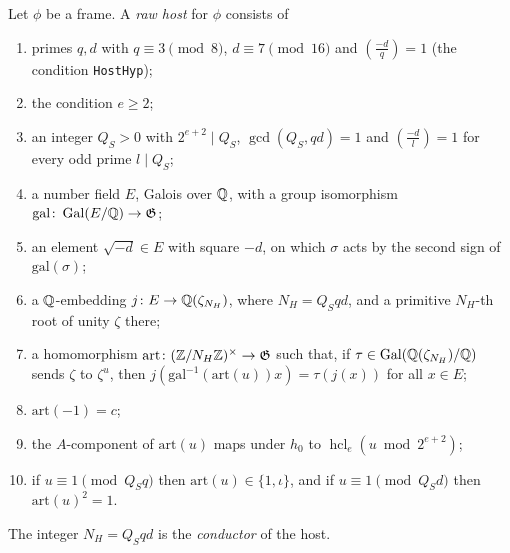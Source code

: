 \begin{definition}\label{host:host-raw}
Let $\phi$ be a frame. A \emph{raw host} for $\phi$ consists of
\begin{enumerate}
\item primes $q,d$ with $q\equiv3\pmod 8$, $d\equiv7\pmod{16}$ and
  $\left(\frac{-d}{q}\right)=1$ (the condition \texttt{HostHyp});
\item the condition $e\ge2$;
\item an integer $Q_S>0$ with $2^{e+2}\mid Q_S$, $\gcd(Q_S,qd)=1$ and
  $\left(\frac{-d}{l}\right)=1$ for every odd prime $l\mid Q_S$;
\item a number field $E$, Galois over $\mathbb{Q}$, with a group isomorphism
  $\mathrm{gal}\colon\operatorname{Gal}(E/\mathbb{Q})\to\mathfrak G$;
\item an element $\sqrt{-d}\in E$ with square $-d$, on which $\sigma$ acts
  by the second sign of $\mathrm{gal}(\sigma)$;
\item a $\mathbb{Q}$-embedding $j\colon E\to\mathbb{Q}(\zeta_{N_H})$, where $N_H=Q_Sqd$, and
  a primitive $N_H$-th root of unity $\zeta$ there;
\item a homomorphism $\mathrm{art}\colon(\mathbb{Z}/N_H\mathbb{Z})^{\times}\to\mathfrak G$
  such that, if $\tau\in\operatorname{Gal}(\mathbb{Q}(\zeta_{N_H})/\mathbb{Q})$ sends $\zeta$ to $\zeta^u$,
  then $j(\mathrm{gal}^{-1}(\mathrm{art}(u))x)=\tau(j(x))$ for all $x\in E$;
\item $\mathrm{art}(-1)=c$;
\item the $A$-component of $\mathrm{art}(u)$ maps under $h_0$ to
  $\operatorname{hcl}_e(u\bmod 2^{e+2})$;
\item if $u\equiv1\pmod{Q_Sq}$ then $\mathrm{art}(u)\in\{1,\iota\}$, and if
  $u\equiv1\pmod{Q_Sd}$ then $\mathrm{art}(u)^2=1$.
\end{enumerate}
The integer $N_H=Q_Sqd$ is the \emph{conductor} of the host.
\end{definition}

